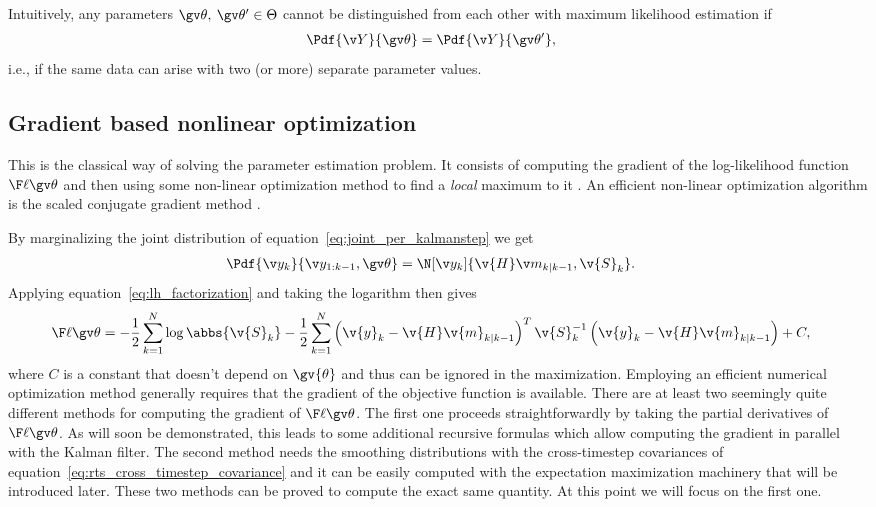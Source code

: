 Intuitively, any parameters $\Th,\:\Th' \in \Theta$ cannot be distinguished
from each other with maximum likelihood estimation if
\begin{align}
	\Pdf{\Y}{\Th}&=\Pdf{\Y}{\Th'},
\end{align}
i.e., if the same data can arise with two (or more) separate
parameter values.
\parencite{Haykin2001,Cappe2005}

\subsection{Gradient based nonlinear optimization}\label{sec:grad}%

This is the classical way of solving the parameter estimation problem. It consists
of computing the gradient of the log-likelihood function $\lLH$ and then using some
non-linear optimization method to find a \emph{local} maximum to it 
\parencite{Mbalawataa,Cappe2005}. 
An efficient non-linear optimization algorithm is the scaled 
conjugate gradient method \parencite{Mbalawataa}.

By marginalizing the joint distribution of equation~\eqref{eq:joint_per_kalmanstep}
we get 
\begin{align}
	\Pdf{\y_k}{\y_{1:k-1},\Th}&=\N[\yk]{\v{H}\m_{k|k-1},\v{S}_k }.
\end{align}
Applying equation~\eqref{eq:lh_factorization} and taking the logarithm then gives
\begin{align}
	\lLH&=-\frac{1}{2}\sum_{k=1}^N\log\abbs{\v{S}_k}
	-\frac{1}{2}\sum_{k=1}^N\left(\v{y}_k-\v{H}\v{m}_{k|k-1}\right)^T\v{S}_{k}^{-1}\left(\v{y}_k-\v{H}\v{m}_{k|k-1}\right)+C,
	\label{eq:logLH}
\end{align}
where $C$ is a constant that doesn't depend on $\gv{\theta}$ and thus can
be ignored in the maximization.
Employing an efficient numerical optimization method generally
requires that the gradient of the objective function is available. 
There are at least two seemingly quite different methods for computing
the gradient of $\lLH$. The first one proceeds straightforwardly by taking the
partial derivatives of $\lLH$. As will soon be demonstrated, this leads
to some additional recursive formulas which allow computing
the gradient in parallel with the Kalman filter. The second method needs
the smoothing distributions with the cross-timestep covariances of equation~\eqref{eq:rts_cross_timestep_covariance}
and it can be easily computed with the expectation maximization machinery
that will be introduced later. These two methods can be proved to compute
the exact same quantity. At this point we will focus on the first one. 

